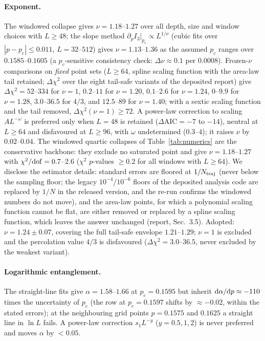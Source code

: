 \documentclass[11pt]{article}
\begin{document}
\paragraph{Exponent.}
The windowed collapse gives $\nu=1.18$--$1.27$ over all depth, size and
window choices with $L\ge48$; the slope method
$\partial_p I_3|_{p_c}\propto L^{1/\nu}$ (cubic fits over
$|p-p_c|\le0.011$, $L=32$--$512$) gives $\nu=1.13$--$1.36$ as the assumed
$p_c$ ranges over $0.1585$--$0.1605$ (a $p_c$-sensitive consistency check:
$\Delta\nu\approx0.1$ per $0.0008$).  Frozen-$\nu$ comparisons on
\emph{fixed} point sets ($L\ge64$, spline scaling function with the area-law
tail retained; $\Delta\chi^2$ over the eight tail-safe variants of the
deposited report) give $\Delta\chi^2=52$--$334$ for $\nu=1$, $0.2$--$11$ for
$\nu=1.20$, $0.1$--$2.6$ for $\nu=1.24$, $0$--$9.9$ for $\nu=1.28$,
$3.0$--$36.5$ for $4/3$, and $12.5$--$89$ for $\nu=1.40$; with a sextic
scaling function and the tail removed, $\Delta\chi^2(\nu=1)\ge72$.  A
power-law correction to scaling $AL^{-\omega}$ is preferred only when $L=48$
is retained ($\Delta\mathrm{AIC}=-7$ to $-14$), neutral at $L\ge64$ and
disfavoured at $L\ge96$, with $\omega$ undetermined ($0.3$--$4$); it raises
$\nu$ by $0.02$--$0.04$.  The windowed quartic collapses of
Table~\ref{tab:numerics} are the conservative backbone: they exclude no
saturated point and give $\nu=1.18$--$1.27$ with $\chi^2/{\rm dof}=0.7$--$2.6$
($\chi^2$ $p$-values $\ge0.2$ for all windows with $L\ge64$).  We disclose
the estimator details: standard errors are floored at $1/N_{\rm traj}$
(never below the sampling floor; the legacy $10^{-4}$/$10^{-6}$ floors of
the deposited analysis code are replaced by $1/N$ in the released version,
and the re-run confirms the windowed numbers do not move), and the area-law
points, for which a polynomial scaling function cannot be flat, are either
removed or replaced by a spline scaling function, which leaves the answer
unchanged (report, Sec.~3.5).  Adopted:
$\nu=1.24\pm0.07$, covering the full tail-safe envelope $1.21$--$1.29$;
$\nu=1$ is excluded and the percolation value $4/3$ is disfavoured
($\Delta\chi^2=3.0$--$36.5$, never excluded by the weakest variant).

\paragraph{Logarithmic entanglement.}
The straight-line fits give $\alpha=1.58$--$1.66$ at $p_c=0.1595$ but
inherit ${\rm d}\alpha/{\rm d}p\approx-110$ times the uncertainty of $p_c$
(the row at $p_c=0.1597$ shifts by ${\approx}-0.02$, within the stated
errors); at the neighbouring grid points $p=0.1575$ and $0.1625$ a straight
line in $\ln L$ fails.  A power-law correction $s_1L^{-y}$
($y=0.5,1,2$) is never preferred and moves $\alpha$ by $<0.05$.
\end{document}
